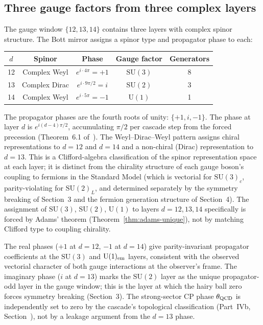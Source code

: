 \documentclass[12pt,a4paper]{article}
\begin{document}
\subsection{Three gauge factors from three complex layers}

The gauge window $\{12,13,14\}$ contains three layers with complex spinor structure. The
Bott mirror assigns a spinor type and propagator phase to each:

\begin{center}
\begin{tabular}{ccccc}
\toprule
$d$ & Spinor & Phase & Gauge factor & Generators \\
\midrule
12 & Complex Weyl  & $e^{i\cdot 4\pi}=+1$ & $\mathrm{SU}(3)$ & 8 \\
13 & Complex Dirac & $e^{i\cdot 9\pi/2}=i$ & $\mathrm{SU}(2)$ & 3 \\
14 & Complex Weyl  & $e^{i\cdot 5\pi}=-1$  & $\mathrm{U}(1)$  & 1 \\
\bottomrule
\end{tabular}
\end{center}

The propagator phases are the fourth roots of unity: $\{+1,i,-1\}$. The phase at layer $d$
is $e^{i(d-4)\pi/2}$, accumulating $\pi/2$ per cascade step from the forced precession
(Theorem~6.1 of~\cite{part2}). The Weyl--Dirac--Weyl pattern assigns chiral
representations to $d=12$ and $d=14$ and a non-chiral (Dirac) representation to
$d=13$. This is a Clifford-algebra classification of the spinor representation space at
each layer; it is distinct from the chirality structure of each gauge boson's coupling
to fermions in the Standard Model (which is vectorial for $\mathrm{SU}(3)_c$,
parity-violating for $\mathrm{SU}(2)_L$, and determined separately by the symmetry
breaking of Section~3 and the fermion generation structure of Section~4). The
assignment of $\mathrm{SU}(3)$, $\mathrm{SU}(2)$, $\mathrm{U}(1)$ to layers $d=12,13,14$
specifically is forced by Adams' theorem (Theorem~\ref{thm:adams-unique}), not by
matching Clifford type to coupling chirality.

The real phases ($+1$ at $d=12$, $-1$ at $d=14$) give parity-invariant propagator
coefficients at the $\mathrm{SU}(3)$ and $\mathrm{U}(1)_{\rm em}$ layers, consistent with
the observed vectorial character of both gauge interactions at the observer's frame.
The imaginary phase ($i$ at $d=13$) marks the $\mathrm{SU}(2)$ layer as the unique
propagator-odd layer in the gauge window; this is the layer at which the hairy ball
zero forces symmetry breaking (Section~3). The strong-sector CP phase $\theta_{\rm QCD}$
is independently set to zero by the cascade's topological classification (Part~IVb, Section~), not by a leakage argument from the $d=13$ phase.
\end{document}
